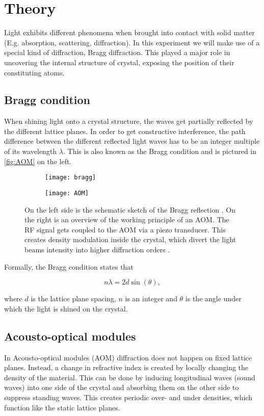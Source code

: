 \section{Theory}
Light exhibits different phenomena when brought into contact with solid matter (E.g. absorption, scattering, diffraction). In this experiment we will make use of a special kind of diffraction, Bragg diffraction. This played a major role in uncovering the internal structure of crystal, exposing the position of their constituting atoms. 

\subsection{Bragg condition}
When shining light onto a crystal structure, the waves get partially reflected by the different lattice planes. In order to get constructive interference, the path difference between the different reflected light waves has to be an integer multiple of its wavelength $\lambda$. This is also known as the Bragg condition and is pictured in \autoref{fig:AOM} on the left.

\begin{figure}[H]
	\begin{subfigure}{.5\textwidth}
		\centering
		\texttt{[image: bragg]}
	\end{subfigure}
	\begin{subfigure}{.5\textwidth}
		\centering
		\texttt{[image: AOM]}
	\end{subfigure}
	\caption{On the left side is the schematic sketch of the Bragg reflection  \autocite{bragg}. On the right is an overview of the working principle of an AOM. The RF signal gets coupled to the AOM via a piezo transducer. This creates density modulation inside the crystal, which divert the light beams intensity into higher diffraction orders \autocite{skript}.}
	\label{fig:AOM}
\end{figure}

Formally, the Bragg condition states that

\begin{equation}\label{eqn:bragg}
	n\lambda = 2d\sin(\theta),
\end{equation}

where \( d \) is the lattice plane spacing, \( n \) is an integer and \( \theta \) is the angle under which the light is shined on the crystal. 

\subsection{Acousto-optical modules}
\label{subsec:AOM}
In Acousto-optical modules (AOM) diffraction does not happen on fixed lattice planes. Instead, a change in refractive index is created by locally changing the density of the material. This can be done by inducing longitudinal waves (sound waves) into one side of the crystal and absorbing them on the other side to suppress standing waves. This creates periodic over- and under densities, which function like the static lattice planes. 


